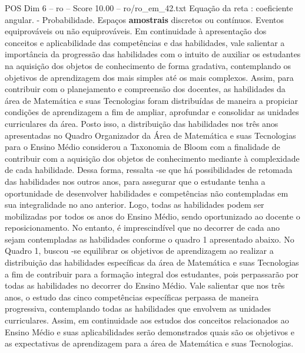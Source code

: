 \begin{textsample}{POS Dim 6 – ro – Score 10.00 – ro/ro\_em\_42.txt}
Equação da reta : coeficiente angular. - Probabilidade.
Espaços \textbf{amostrais} discretos ou contínuos.
Eventos equiprováveis ou não equiprováveis.
Em continuidade à apresentação dos conceitos e aplicabilidade das competências e das habilidades, vale salientar a importância da progressão das habilidades com o intuito de auxiliar os estudantes na aquisição dos objetos de conhecimento de forma gradativa, contemplando os objetivos de aprendizagem dos mais simples até os mais complexos.
Assim, para contribuir com o planejamento e compreensão dos docentes, as habilidades da área de Matemática e suas Tecnologias foram distribuídas de maneira a propiciar condições de aprendizagem a fim de ampliar, aprofundar e consolidar as unidades curriculares da área.
Posto isso, a distribuição das habilidades nos três anos apresentadas no Quadro Organizador da Área de Matemática e suas Tecnologias para o Ensino Médio considerou a Taxonomia de Bloom com a finalidade de contribuir com a aquisição dos objetos de conhecimento mediante à complexidade de cada habilidade.
Dessa forma, ressalta -se que há possibilidades de retomada das habilidades nos outros anos, para assegurar que o estudante tenha a oportunidade de desenvolver habilidades e competências não contempladas em sua integralidade no ano anterior.
Logo, todas as habilidades podem ser mobilizadas por todos os anos do Ensino Médio, sendo oportunizado ao docente o reposicionamento.
No entanto, é imprescindível que no decorrer de cada ano sejam contempladas as habilidades conforme o quadro 1 apresentado abaixo.
No Quadro 1, buscou -se equilibrar os objetivos de aprendizagem ao realizar a distribuição das habilidades específicas da área de Matemática e suas Tecnologias a fim de contribuir para a formação integral dos estudantes, pois perpassarão por todas as habilidades no decorrer do Ensino Médio.
Vale salientar que nos três anos, o estudo das cinco competências específicas perpassa de maneira progressiva, contemplando todas as habilidades que envolvem as unidades curriculares.
Assim, em continuidade aos estudos dos conceitos relacionados ao Ensino Médio e suas aplicabilidades serão demonstrados quais são os objetivos e as expectativas de aprendizagem para a área de Matemática e suas Tecnologias.

\end{textsample}
